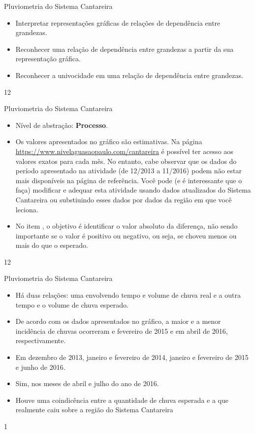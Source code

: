 \clearmargin
\begin{objectives}{Pluviometria do Sistema Cantareira}
{
\begin{itemize}

\item Interpretar representações gráficas de relações de dependência entre grandezas.

\item Reconhecer uma relação de dependência entre grandezas a partir da sua representação gráfica.

\item Reconhecer a univocidade em uma relação de dependência entre grandezas.

\end{itemize}
}{1}{2}
\end{objectives}
\begin{sugestions}{Pluviometria do Sistema Cantareira}
{
\begin{itemize}
\item Nível de abstração: \textbf{Processo}.

\item Os valores apresentados no gráfico são estimativas. Na página \url{https://www.nivelaguasaopaulo.com/cantareira} é possível ter acesso aos valores exatos para cada mês. No entanto, cabe observar que os dados do período apresentado na atividade (de 12/2013 a 11/2016) podem não estar mais disponíveis na página de referência. Você pode (e é interessante que o faça) modificar e adequar esta atividade usando dados atualizados do Sistema Cantareira ou substiuindo esses dados por dados da região em que você leciona.

\item No item , o objetivo é identificar o valor absoluto da diferença, não sendo importante se o valor é positivo ou negativo, ou seja, se choveu menos ou mais do que o esperado.
\end{itemize}

}{1}{2}
\end{sugestions}
\begin{answer}{Pluviometria do Sistema Cantareira}
{
\begin{itemize}
\item {} 
Há duas relações: uma envolvendo tempo e volume de chuva real e a outra tempo e o volume de chuva esperado.

\item {} 
De acordo com os dados apresentados no gráfico, a maior e a menor incidência de chuvas ocorreram e fevereiro de 2015 e em abril de 2016, respectivamente.

\item {} 
Em dezembro de 2013, janeiro e fevereiro de 2014, janeiro e fevereiro de 2015 e junho de 2016.

\item {} 
Sim, nos meses de abril e julho do ano de 2016.

\item {} 
Houve uma coindicência entre a quantidade de chuva esperada e a que realmente caiu sobre a região do Sistema Cantareira

\end{itemize}
}{1}
\end{answer}
